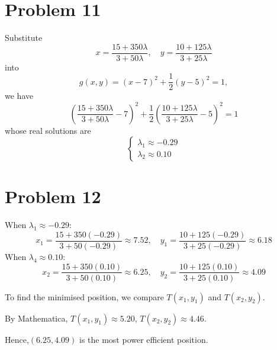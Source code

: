 \documentclass[12pt,a4paper]{article}
\begin{document}
\section*{Problem 11}
\begin{solution}
    Substitute 
    \[
x = \frac{15 + 350\lambda}{3 + 50\lambda}, \quad y = \frac{10 + 125\lambda}{3 + 25\lambda}
\]
into
\[
g(x, y) = (x - 7)^2 + \frac{1}{2}(y - 5)^2 = 1,
\]
we have
\[
\left(\frac{15 + 350\lambda}{3 + 50\lambda} - 7\right)^2 + \frac{1}{2} \left(\frac{10 + 125\lambda}{3 + 25\lambda} - 5\right)^2 = 1
\]
whose real solutions are 
\[
\begin{cases}
    \lambda_1\approx-0.29\\
    \lambda_2\approx0.10
\end{cases}
\]
\end{solution}

\section*{Problem 12}
\begin{solution}
When \(\lambda_1 \approx -0.29\):
   \[
   x_1 = \frac{15 + 350(-0.29)}{3 + 50(-0.29)} \approx 7.52, \quad y_1 = \frac{10 + 125(-0.29)}{3 + 25(-0.29)} \approx 6.18
   \]
When \(\lambda_4 \approx 0.10\):
 \[
   x_2 = \frac{15 + 350(0.10)}{3 + 50(0.10)} \approx 6.25, \quad y_2 = \frac{10 + 125(0.10)}{3 + 25(0.10)} \approx 4.09
   \]

To find the minimised position, we compare $T(x_1,y_1)$ and $T(x_2,y_2)$.

By Mathematica, $T(x_1,y_1) \approx 5.20$, $T(x_2,y_2)\approx4.46$.

Hence,$(6.25,4.09)$ is the most power efficient position.

 \end{solution}  
\end{document}
